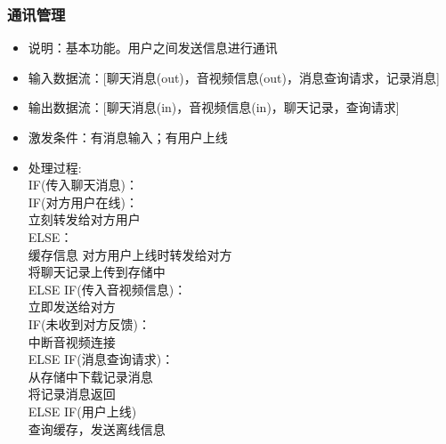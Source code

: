             \subsubsection{通讯管理}
            \begin{itemize}
                \item 说明：基本功能。用户之间发送信息进行通讯
                \item 输入数据流：[聊天消息(out)，音视频信息(out)，消息查询请求，记录消息]
                \item 输出数据流：[聊天消息(in)，音视频信息(in)，聊天记录，查询请求]
                \item 激发条件：有消息输入；有用户上线
                \item 处理过程: \\
                    IF(传入聊天消息)：\\
                        IF(对方用户在线)：\\
                            立刻转发给对方用户\\
                        ELSE：\\
                            缓存信息 对方用户上线时转发给对方\\
                        将聊天记录上传到存储中\\
                    ELSE IF(传入音视频信息)：\\
                        立即发送给对方\\
                        IF(未收到对方反馈)：\\
                            中断音视频连接\\
                    ELSE IF(消息查询请求)：\\
                        从存储中下载记录消息\\
                        将记录消息返回\\
                    ELSE IF(用户上线)\\
                        查询缓存，发送离线信息\\
            \end{itemize}
